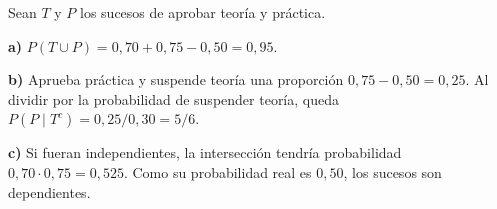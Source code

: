 Sean $T$ y $P$ los sucesos de aprobar teoría y práctica.

\textbf{a)} $P(T\cup P)=0{,}70+0{,}75-0{,}50=\boxed{0{,}95}$.

\textbf{b)} Aprueba práctica y suspende teoría una proporción $0{,}75-0{,}50=0{,}25$. Al dividir por la probabilidad de suspender teoría, queda $P(P\mid T^c)=0{,}25/0{,}30=\boxed{5/6}$.

\textbf{c)} Si fueran independientes, la intersección tendría probabilidad $0{,}70\cdot0{,}75=0{,}525$. Como su probabilidad real es $0{,}50$, los sucesos son dependientes.
